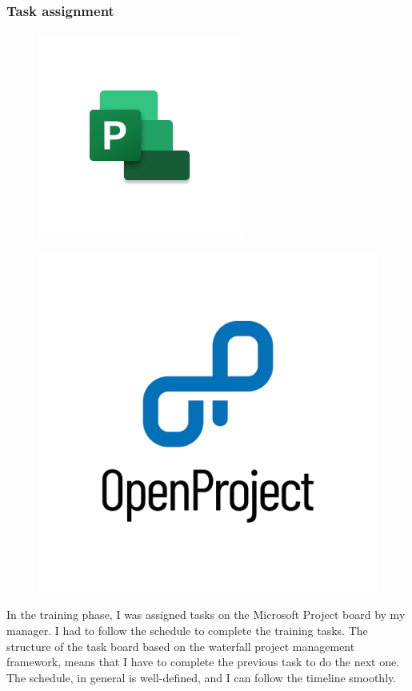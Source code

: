     
    \subsubsection{Task assignment}
    \begin{figure}[H]
        \centering
        \begin{minipage}{.5\textwidth}
          \centering
          \includegraphics[width=.4\linewidth]{graphics/ms-project.png}
          \label{fig:msProject}
        \end{minipage}%
        \begin{minipage}{.5\textwidth}
          \centering
          \includegraphics[width=.4\linewidth]{graphics/openproject-logo.png}
          \label{fig:openProject}
        \end{minipage}
    \end{figure}

    In the training phase, I was assigned tasks on the Microsoft Project board by my manager. I had to follow the schedule to complete the training tasks. The structure of the task board based on the waterfall project management framework, means that I have to complete the previous task to do the next one. The schedule, in general is well-defined, and I can follow the timeline smoothly. \\
    
